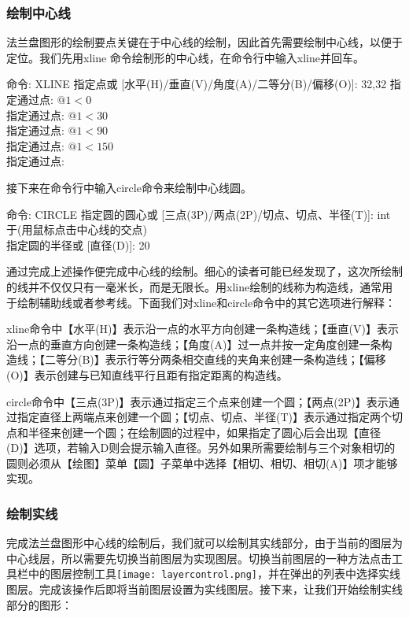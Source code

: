 \subsubsection{绘制中心线}
法兰盘图形的绘制要点关键在于中心线的绘制，因此首先需要绘制中心线，以便于定位。我们先用xline 命令绘制形的中心线，在命令行中输入xline并回车。

\noindent
命令: XLINE 指定点或 [水平(H)/垂直(V)/角度(A)/二等分(B)/偏移(O)]: 32,32
指定通过点: $@1<0$\\
指定通过点: $@1<30$\\
指定通过点: $@1<90$\\
指定通过点: $@1<150$\\
指定通过点:\\
\indent

接下来在命令行中输入circle命令来绘制中心线圆。

\noindent
命令: CIRCLE 指定圆的圆心或 [三点(3P)/两点(2P)/切点、切点、半径(T)]: int 于(用鼠标点击中心线的交点)\\
指定圆的半径或 [直径(D)]: 20\\
\indent

通过完成上述操作便完成中心线的绘制。细心的读者可能已经发现了，这次所绘制的线并不仅仅只有一毫米长，而是无限长。用xline绘制的线称为构造线，通常用于绘制辅助线或者参考线。下面我们对xline和circle命令中的其它选项进行解释：

xline命令中【水平(H)】表示沿一点的水平方向创建一条构造线；【垂直(V)】表示沿一点的垂直方向创建一条构造线；【角度(A)】过一点并按一定角度创建一条构造线；【二等分(B)】表示行等分两条相交直线的夹角来创建一条构造线；【偏移(O)】表示创建与已知直线平行且距有指定距离的构造线。

circle命令中【三点(3P)】表示通过指定三个点来创建一个圆；【两点(2P)】表示通过指定直径上两端点来创建一个圆；【切点、切点、半径(T)】表示通过指定两个切点和半径来创建一个圆；在绘制圆的过程中，如果指定了圆心后会出现【直径(D)】选项，若输入D则会提示输入直径。另外如果所需要绘制与三个对象相切的圆则必须从【绘图】菜单【圆】子菜单中选择【相切、相切、相切(A)】项才能够实现。
\subsubsection{绘制实线}
完成法兰盘图形中心线的绘制后，我们就可以绘制其实线部分，由于当前的图层为中心线层，所以需要先切换当前图层为实现图层。切换当前图层的一种方法点击工具栏中的图层控制工具\texttt{[image: layercontrol.png]}，并在弹出的列表中选择实线图层。完成该操作后即将当前图层设置为实线图层。接下来，让我们开始绘制实线部分的图形：

